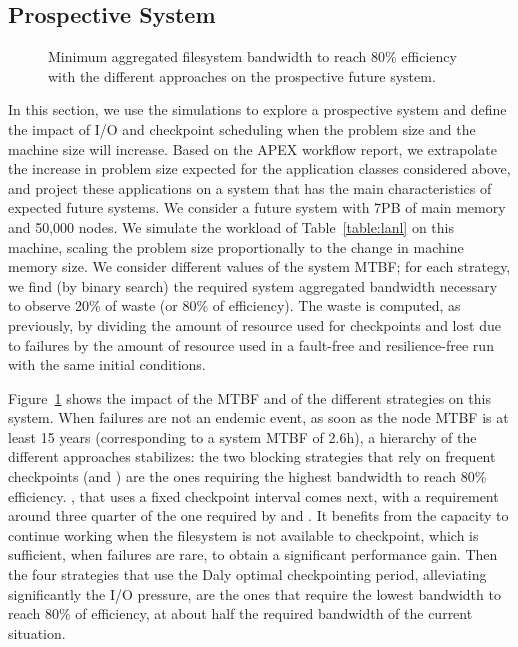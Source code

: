 \subsection{Prospective System}

\begin{figure}
  \begin{center}
    \resizebox{\linewidth}{!}{}
  \end{center}
  \caption{Minimum aggregated filesystem bandwidth to reach 80\%
    efficiency with the different approaches on the prospective
    future system.\label{fig:prosp}}
\end{figure}

In this section, we use the simulations to explore a prospective
system and define the impact of I/O and checkpoint scheduling when the
problem size and the machine size will increase. Based on the APEX
workflow report, we extrapolate the increase in problem size expected
for the application classes considered above, and project these
applications on a system that has the main characteristics of expected
future systems. We consider a future system with 7PB of main memory
and 50,000 nodes. We simulate the workload of Table~\ref{table:lanl}
on this machine, scaling the problem size proportionally to the
change in machine memory size. We consider different values of the
system MTBF; for each strategy, we find (by binary search) the
required system aggregated bandwidth necessary to observe 20\% of
waste (or 80\% of efficiency). The waste is computed, as previously,
by dividing the amount of resource used for checkpoints and lost due
to failures by the amount of resource used in a fault-free and
resilience-free run with the same initial conditions.

Figure~\ref{fig:prosp} shows the impact of the MTBF and of the
different strategies on this system. When failures are not an endemic
event, \ie as soon as the node MTBF is at least 15 years
(corresponding to a system MTBF of 2.6h), a hierarchy of the different
approaches stabilizes: the two blocking strategies that rely on
frequent checkpoints (\propfixed and \bfifofixed) are the ones
requiring the highest bandwidth to reach 80\%
efficiency. %
\fifofixed, that uses a fixed checkpoint interval comes next, with a
requirement around three quarter of the one required by \propfixed and
\fifofixed. It benefits from the capacity to continue working when the
filesystem is not available to checkpoint, which is sufficient, when
failures are rare, to obtain a significant performance
gain. %
Then the four strategies that use the Daly optimal checkpointing
period, alleviating significantly the I/O pressure, are the ones that
require the lowest bandwidth to reach 80\% of efficiency, at about
half the required bandwidth of the current
situation. %

